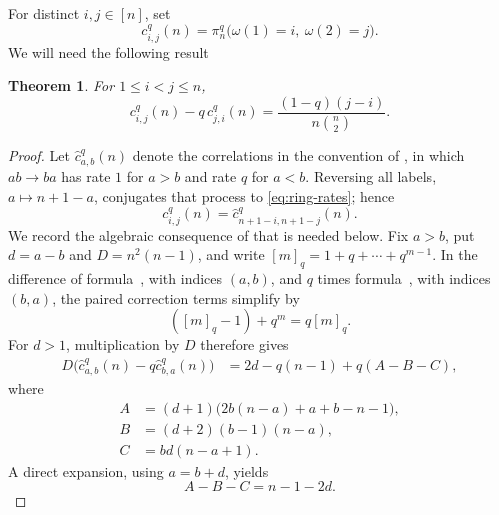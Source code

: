 \documentclass[11pt,a4paper]{amsart}
\newtheorem{theorem}{Theorem}[section]
\theoremstyle{definition}
\theoremstyle{remark}
\numberwithin{equation}{section}
\begin{document}
	For distinct $i,j\in[n]$, set
	\begin{equation}\label{eq:ring-correlations-definition}
		c_{i,j}^q(n)=\pi_n^q\bigl(\omega(1)=i,\ \omega(2)=j\bigr).
	\end{equation}
	We will need the following result
	
	\begin{theorem}\label{thm:ring-current-identity}
		For $1\le i<j\le n$,
		\begin{equation}\label{eq:ring-current-identity}
			c_{i,j}^q(n)-q\,c_{j,i}^q(n)
			=\frac{(1-q)(j-i)}{n\binom n2}.
		\end{equation}
	\end{theorem}
	
	\begin{proof}
		Let $\widehat c_{a,b}^q(n)$ denote the correlations in the convention of
		\cite{PahujaCorrelations}, in which $ab\to ba$ has rate $1$ for $a>b$ and
		rate $q$ for $a<b$.  Reversing all labels, $a\mapsto n+1-a$, conjugates that
		process to \eqref{eq:ring-rates}; hence
		\begin{equation}\label{eq:correlation-label-reversal}
			c_{i,j}^q(n)=
			\widehat c_{n+1-i,n+1-j}^q(n).
		\end{equation}
		We record the algebraic consequence of
		\cite[Theorem~2.2]{PahujaCorrelations} that is needed below.  Fix $a>b$, put
		$d=a-b$ and $D=n^2(n-1)$, and write
		$[m]_q=1+q+\cdots+q^{m-1}$.  In the difference of formula~\cite[(2.1)]{PahujaCorrelations}, with
		indices $(a,b)$, and $q$ times formula~\cite[(2.2)]{PahujaCorrelations}, with indices $(b,a)$, the
		paired correction terms simplify by
		\begin{equation}\label{eq:q-integer-pairing}
			([m]_q-1)+q^m=q[m]_q.
		\end{equation}
		For $d>1$, multiplication by $D$ therefore gives
		\begin{align}\label{eq:current-simplification}
			D\bigl(\widehat c_{a,b}^q(n)-q\widehat c_{b,a}^q(n)\bigr)
			&=2d-q(n-1)+q(A-B-C),
		\end{align}
		where
		\begin{align*}
			A&=(d+1)\bigl(2b(n-a)+a+b-n-1\bigr),\\
			B&=(d+2)(b-1)(n-a),\\
			C&=bd(n-a+1).
		\end{align*}
		A direct expansion, using $a=b+d$, yields
		\begin{equation}\label{eq:pahuja-polynomial-cancellation}
			A-B-C=n-1-2d.
		\end{equation}

\end{proof}
\end{document}
